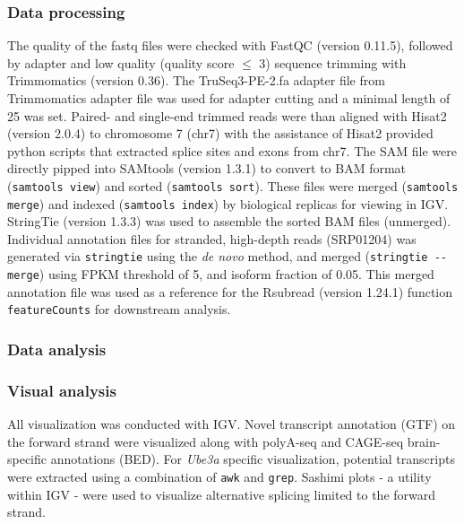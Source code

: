 \subsubsection{Data processing}
The quality of the fastq files were checked with FastQC \cite{Andrews_Fastqc} (version 0.11.5), followed by adapter and low quality (quality score $\leq$ 3) sequence trimming with Trimmomatics \cite{Bolger2014} (version 0.36). The TruSeq3-PE-2.fa adapter file from Trimmomatics adapter file was used for adapter cutting and a minimal length of 25 was set. Paired- and single-end trimmed reads were than aligned with Hisat2 \cite{Pertea2016,Kim2015} (version 2.0.4) to chromosome 7 (chr7) with the assistance of Hisat2 provided python scripts that extracted splice sites and exons from chr7. The SAM file were directly pipped into SAMtools \cite{Li2009} (version 1.3.1) to convert to BAM format (\texttt{samtools view}) and sorted (\texttt{samtools sort}). These files were merged (\texttt{samtools merge}) and indexed (\texttt{samtools index}) by biological replicas for viewing in IGV. StringTie \cite{Pertea2015,Pertea2016} (version 1.3.3) was used to assemble the sorted BAM files (unmerged). Individual annotation files for stranded, high-depth reads (SRP01204) was generated via \texttt{stringtie} using the \textit{de novo} method, and merged (\texttt{stringtie -{}-merge}) using FPKM threshold of 5, and isoform fraction of 0.05. This merged annotation file was used as a reference for the Rsubread \cite{Liao2013a} (version 1.24.1) function \texttt{featureCounts} \cite{Liao2013b} for downstream analysis.

\subsubsection{Data analysis}
\subsubsection*{Visual analysis}
All visualization was conducted with IGV. Novel transcript annotation (GTF) on the forward strand were visualized along with polyA-seq and CAGE-seq brain-specific annotations (BED). For \textit{Ube3a} specific visualization, potential transcripts were extracted using a combination of \texttt{awk} and \texttt{grep}. Sashimi plots - a utility within IGV - were used to visualize alternative splicing limited to the forward strand.

